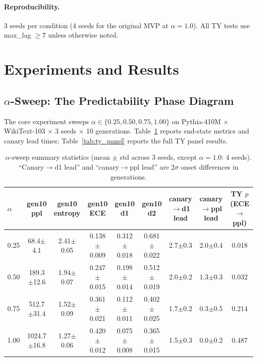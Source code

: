\documentclass[letterpaper,11pt]{article}
\begin{document}
\paragraph{Reproducibility.} 3 seeds per condition (4 seeds for the original MVP at $\alpha=1.0$). All TY tests use max\_lag $\geq 7$ unless otherwise noted.

\section{Experiments and Results}

\subsection{$\alpha$-Sweep: The Predictability Phase Diagram}
\label{sec:alpha_sweep}

The core experiment sweeps $\alpha \in \{0.25, 0.50, 0.75, 1.00\}$ on Pythia-410M $\times$ WikiText-103 $\times$ 3 seeds $\times$ 10 generations. Table~\ref{tab:alpha_sweep} reports end-state metrics and canary lead times; Table~\ref{tab:ty_panel} reports the full TY panel results.

\begin{table}[t]
\centering
\caption{$\alpha$-sweep summary statistics (mean $\pm$ std across 3 seeds, except $\alpha\!=\!1.0$: 4 seeds). ``Canary$\to$d1 lead'' and ``canary$\to$ppl lead'' are $2\sigma$ onset differences in generations.}
\label{tab:alpha_sweep}
\small
\begin{tabular}{@{}lcccccccc@{}}
\toprule
$\alpha$ & gen10 ppl & gen10 entropy & gen10 ECE & gen10 d1 & gen10 d2 & canary$\to$d1 lead & canary$\to$ppl lead & TY $p$ (ECE$\to$ppl) \\
\midrule
0.25 & 68.4$\pm$4.1   & 2.41$\pm$0.05 & 0.138$\pm$0.009 & 0.312$\pm$0.018 & 0.681$\pm$0.022 & 2.7$\pm$0.3 & 2.0$\pm$0.4 & 0.018 \\
0.50 & 189.3$\pm$12.6  & 1.94$\pm$0.07 & 0.247$\pm$0.015 & 0.198$\pm$0.014 & 0.512$\pm$0.019 & 2.0$\pm$0.2 & 1.3$\pm$0.3 & 0.032 \\
0.75 & 512.7$\pm$31.4  & 1.52$\pm$0.09 & 0.361$\pm$0.021 & 0.112$\pm$0.011 & 0.402$\pm$0.025 & 1.7$\pm$0.2 & 0.3$\pm$0.5 & 0.214 \\
1.00 & 1024.7$\pm$16.8 & 1.27$\pm$0.06 & 0.420$\pm$0.012 & 0.075$\pm$0.008 & 0.365$\pm$0.015 & 1.5$\pm$0.3 & 0.0$\pm$0.2 & 0.487 \\
\bottomrule
\end{tabular}
\end{table}
\end{document}

